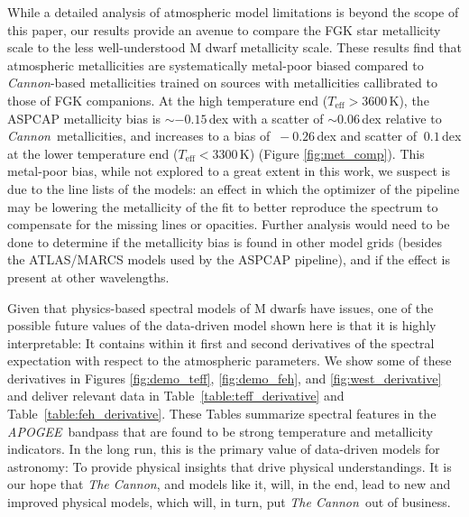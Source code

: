 \documentclass[twocolumn]{aastex62}
\newcommand{\apogee}{\textsl{APOGEE}}
\newcommand{\thecannon}{\textsl{The Cannon}}
\newcommand{\cannon}{\textsl{Cannon}}
\newcommand{\teff}{T_{\mathrm{eff}}}
\begin{document}
While a detailed analysis of atmospheric model limitations is beyond the scope of this paper, 
our results provide an avenue to compare the FGK star metallicity scale 
to the less well-understood M dwarf metallicity scale.
These results find that atmospheric metallicities are systematically metal-poor biased
compared to \cannon-based metallicities trained on sources with metallicities callibrated
to those of FGK companions. 
At the high temperature end ($\teff > 3600$\,K), the ASPCAP metallicity bias is $\sim-0.15\,$dex with a
scatter of $\sim0.06\,$dex relative to \cannon\ metallicities, and increases to a bias of $\>-0.26\,$dex 
and scatter of $\>0.1\,$dex at the lower temperature end ($\teff < 3300$\,K) (Figure \ref{fig:met_comp}).
This metal-poor bias, while not explored to a great extent in this work, we suspect is due 
to the line lists of the models: 
an effect in which the optimizer of the pipeline may be lowering the metallicity of the fit 
to better reproduce the spectrum to compensate for the missing lines or opacities.
Further analysis would need to be done to determine if the metallicity bias
is found in other model grids (besides the ATLAS/MARCS models used by the ASPCAP pipeline), 
and if the effect is present at other wavelengths.

Given that physics-based spectral models of M dwarfs have issues, one of the possible
future values of the data-driven model shown here is that it is highly interpretable:
It contains within it first and second derivatives of the spectral expectation with
respect to the atmospheric parameters.
We show some of these derivatives in Figures \ref{fig:demo_teff}, \ref{fig:demo_feh}, and \ref{fig:west_derivative} and deliver relevant data in
Table~\ref{table:teff_derivative} and Table~\ref{table:feh_derivative}.
These Tables summarize spectral features in the \apogee\ bandpass
that are found to be strong temperature and metallicity indicators.
In the long run, this is the primary value of data-driven models for astronomy:
To provide physical insights that drive physical understandings.
It is our hope that \thecannon, and models like it, will, in the end, lead to
new and improved physical models, which will, in turn, put \thecannon\ out of business. \\
\end{document}
